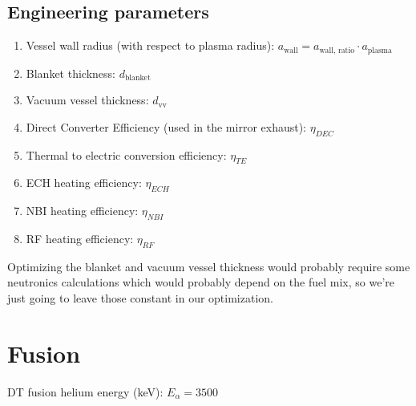 \subsection{Engineering parameters}

\begin{enumerate}
    \item Vessel wall radius (with respect to plasma radius): $a_{\text{wall}} = a_\text{wall, ratio} \cdot a_\text{plasma}$
    \item Blanket thickness: $d_\text{blanket}$
    \item Vacuum vessel thickness: $d_\text{vv}$
    \item Direct Converter Efficiency (used in the mirror exhaust): $\eta_{DEC}$
    \item Thermal to electric conversion efficiency: $\eta_{TE}$
    \item ECH heating efficiency: $\eta_{ECH}$
    \item NBI heating efficiency: $\eta_{NBI}$
    \item RF heating efficiency: $\eta_{RF}$    
\end{enumerate}

Optimizing the blanket and vacuum vessel thickness would probably require some neutronics calculations which would probably depend on the fuel mix, so we're just going to leave those constant in our optimization.

\section{Fusion}
DT fusion helium energy (keV): $E_\alpha = 3500$

